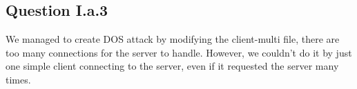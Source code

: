 \subsection*{Question I.a.3}
We managed to create DOS attack by modifying the client-multi file, there are too many connections for the server to handle. However, we couldn't do it by just one simple client connecting to the server, even if it requested the server many times.



